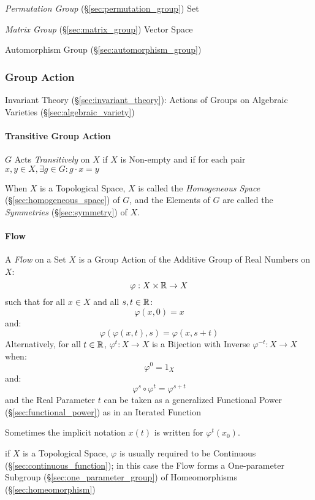 \emph{Permutation Group} (\S\ref{sec:permutation_group}) Set

\emph{Matrix Group} (\S\ref{sec:matrix_group}) Vector Space

Automorphism Group (\S\ref{sec:automorphism_group})



\subsubsection{Group Action}\label{sec:group_action}

Invariant Theory (\S\ref{sec:invariant_theory}): Actions of Groups on
Algebraic Varieties (\S\ref{sec:algebraic_variety})



\paragraph{Transitive Group Action}\label{sec:transitive_action}\hfill

$G$ Acts \emph{Transitively} on $X$ if $X$ is Non-empty and if for each pair
$x,y \in X, \exists g \in G : g \cdot x = y$

When $X$ is a Topological Space, $X$ is called the \emph{Homogeneous Space}
(\S\ref{sec:homogeneous_space}) of $G$, and the Elements of $G$ are called the
\emph{Symmetries} (\S\ref{sec:symmetry}) of $X$.



\paragraph{Flow}\label{sec:flow}\hfill

A \emph{Flow} on a Set $X$ is a Group Action of the Additive Group of Real
Numbers on $X$:
\[
  \varphi : X \times \mathbb{R} \rightarrow X
\]
such that for all $x \in X$ and all $s,t \in \mathbb{R}$:
\[
  \varphi(x,0) = x
\]
and:
\[
  \varphi(\varphi(x,t),s) = \varphi(x,s+t)
\]
Alternatively, for all $t \in \mathbb{R}$, $\varphi^t : X \rightarrow X$ is a
Bijection with Inverse $\varphi^{-t} : X \rightarrow X$ when:
\[
  \varphi^0 = 1_X
\]
and:
\[
  \varphi^s \circ \varphi^t = \varphi^{s + t}
\]
and the Real Parameter $t$ can be taken as a generalized Functional Power
(\S\ref{sec:functional_power}) as in an Iterated Function

Sometimes the implicit notation $x(t)$ is written for $\varphi^t(x_0)$.

if $X$ is a Topological Space, $\varphi$ is usually required to be Continuous
(\S\ref{sec:continuous_function}); in this case the Flow forms a One-parameter
Subgroup (\S\ref{sec:one_parameter_group}) of Homeomorphisms
(\S\ref{sec:homeomorphism})

